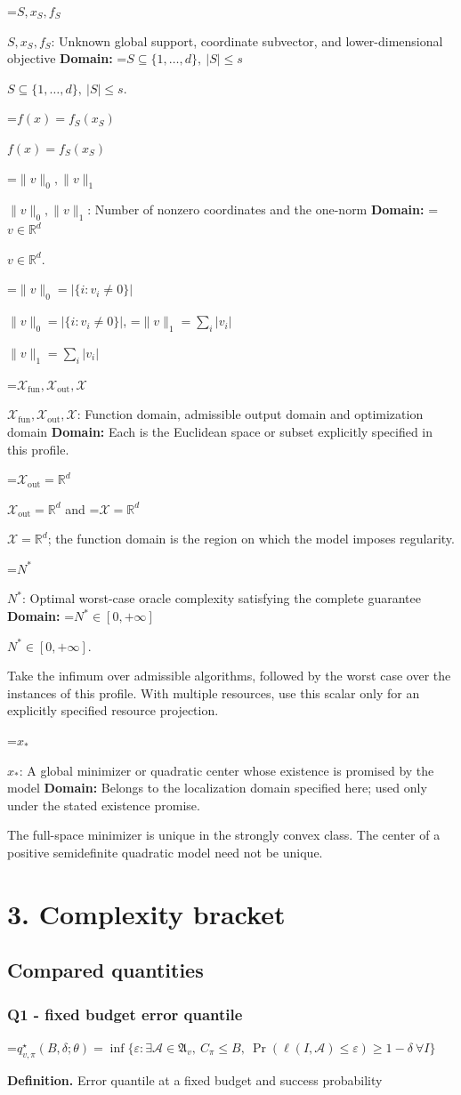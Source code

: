 \documentclass[10pt,a4paper]{article}
\newcommand{\AtlasMath}[1]{\par\begingroup\centering\setbox0=\hbox{$\displaystyle #1$}\ifdim\wd0>1.4\linewidth\typeout{ATLAS WIDE FORMULA: \the\wd0}\fi\ifdim\wd0>\linewidth\resizebox{\linewidth}{!}{\box0}\else\box0\fi\par\endgroup}
\newcommand{\AtlasInlineMath}[1]{\begingroup\setbox0=\hbox{$#1$}\ifdim\wd0>.4\linewidth\endgroup\AtlasMath{#1}\else\endgroup$#1$\fi}
\begin{document}
\AtlasInlineMath{S,x_S,f_S}: Unknown global support, coordinate subvector, and lower-dimensional objective \textbf{Domain:} \AtlasInlineMath{S\subseteq\{1,\ldots,d\},\ |S|\le s}.

\AtlasInlineMath{f(x)=f_S(x_S)}

\AtlasInlineMath{\|v\|_0,\|v\|_1}: Number of nonzero coordinates and the one-norm \textbf{Domain:} \AtlasInlineMath{v\in\mathbb{R}^d}.

\AtlasInlineMath{\|v\|_0=|\{i:v_i\ne0\}|}, \AtlasInlineMath{\|v\|_1=\sum_i|v_i|}

\AtlasInlineMath{\mathcal{X}_{\mathrm{fun}},\mathcal{X}_{\mathrm{out}},\mathcal{X}}: Function domain, admissible output domain and optimization domain \textbf{Domain:} Each is the Euclidean space or subset explicitly specified in this profile.

\AtlasInlineMath{\mathcal{X}_{\mathrm{out}}=\mathbb{R}^d} and \AtlasInlineMath{\mathcal{X}=\mathbb{R}^d}; the function domain is the region on which the model imposes regularity.

\AtlasInlineMath{N^*}: Optimal worst-case oracle complexity satisfying the complete guarantee \textbf{Domain:} \AtlasInlineMath{N^*\in[0,+\infty]}.

Take the infimum over admissible algorithms, followed by the worst case over the instances of this profile. With multiple resources, use this scalar only for an explicitly specified resource projection.

\AtlasInlineMath{x_*}: A global minimizer or quadratic center whose existence is promised by the model \textbf{Domain:} Belongs to the localization domain specified here; used only under the stated existence promise.

The full-space minimizer is unique in the strongly convex class. The center of a positive semidefinite quadratic model need not be unique.

\section{3. Complexity bracket}
\subsection{Compared quantities}
\subsubsection{Q1 - fixed budget error quantile}
\AtlasMath{q^\star_{v,\pi}(B,\delta;\theta)=\inf\{\varepsilon:\exists\mathcal A\in\mathfrak A_v,\ C_\pi\le B,\ \Pr(\ell(I,\mathcal A)\le\varepsilon)\ge1-\delta\ \forall I\}}
\textbf{Definition.} Error quantile at a fixed budget and success probability
\end{document}
